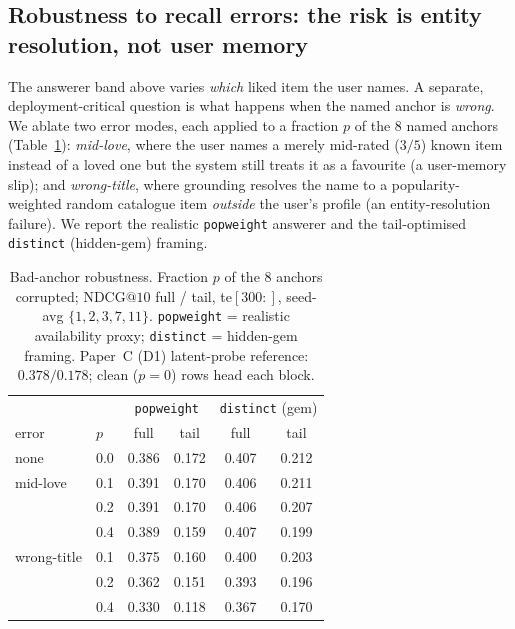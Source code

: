 \documentclass[11pt]{article}
\makeatletter
\newcommand{\ndcg}{\mathrm{NDCG@}10}
\makeatother
\begin{document}
\subsection{Robustness to recall errors: the risk is entity resolution, not user memory}
\label{sec:badanchor}
The answerer band above varies \emph{which} liked item the user names. A separate, deployment-critical question is what
happens when the named anchor is \emph{wrong}. We ablate two error modes, each applied to a fraction $p$ of the $8$ named
anchors (Table~\ref{tab:badanchor}): \emph{mid-love}, where the user names a merely mid-rated ($3/5$) known item instead
of a loved one but the system still treats it as a favourite (a user-memory slip); and \emph{wrong-title}, where
grounding resolves the name to a popularity-weighted random catalogue item \emph{outside} the user's profile (an
entity-resolution failure). We report the realistic \texttt{popweight} answerer and the tail-optimised \texttt{distinct}
(hidden-gem) framing.

\begin{table}[t]
\centering
\caption{Bad-anchor robustness. Fraction $p$ of the $8$ anchors corrupted; $\ndcg$ full / tail, te$[300{:}]$, seed-avg
$\{1,2,3,7,11\}$. \texttt{popweight} = realistic availability proxy; \texttt{distinct} = hidden-gem framing. Paper~C
(D1) latent-probe reference: $0.378/0.178$; clean ($p{=}0$) rows head each block.}
\label{tab:badanchor}
\begin{tabular}{llcccc}
\toprule
 & & \multicolumn{2}{c}{\texttt{popweight}} & \multicolumn{2}{c}{\texttt{distinct} (gem)} \\
error & $p$ & full & tail & full & tail \\
\midrule
none        & 0.0 & 0.386 & 0.172 & 0.407 & 0.212 \\
\midrule
mid-love    & 0.1 & 0.391 & 0.170 & 0.406 & 0.211 \\
            & 0.2 & 0.391 & 0.170 & 0.406 & 0.207 \\
            & 0.4 & 0.389 & 0.159 & 0.407 & 0.199 \\
\midrule
wrong-title & 0.1 & 0.375 & 0.160 & 0.400 & 0.203 \\
            & 0.2 & 0.362 & 0.151 & 0.393 & 0.196 \\
            & 0.4 & 0.330 & 0.118 & 0.367 & 0.170 \\
\bottomrule
\end{tabular}
\end{table}
\end{document}
